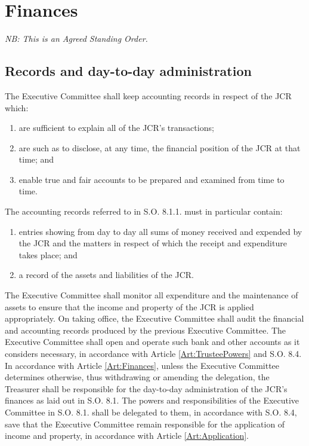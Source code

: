 \chapter{Finances}
\hspace*{-10pt}\textit{NB: This is an Agreed Standing Order.}
\section{Records and day-to-day administration}
\npara The Executive Committee shall keep accounting records in respect of the JCR which:
\begin{enumerate}
\item are sufficient to explain all of the JCR's transactions;
\item are such as to disclose, at any time, the financial position of the JCR at that time; and
\item enable true and fair accounts to be prepared and examined from time to time.
\end{enumerate}
\npara The accounting records referred to in S.O. 8.1.1. must in particular contain:
\begin{enumerate}
\item entries showing from day to day all sums of money received and expended by the JCR and the matters in respect of which the receipt and expenditure takes place; and
\item a record of the assets and liabilities of the JCR.
\end{enumerate}
\npara The Executive Committee shall monitor all expenditure and the maintenance of assets to ensure that the income and property of the JCR is applied appropriately.
\npara On taking office, the Executive Committee shall audit the financial and accounting records produced by the previous Executive Committee.
\npara The Executive Committee shall open and operate such bank and other accounts as it considers  necessary, in accordance with Article \ref{Art:TrusteePowers} and S.O. 8.4.
\npara In accordance with Article \ref{Art:Finances}, unless the Executive Committee determines otherwise, thus withdrawing or amending the delegation, the Treasurer shall be responsible for the day-to-day administration of the JCR's finances as laid out in S.O. 8.1.  The powers and responsibilities of the Executive Committee in S.O. 8.1. shall be delegated to them, in accordance with S.O. 8.4, save that the Executive Committee remain responsible for the application of income and property, in accordance with Article \ref{Art:Application}.
